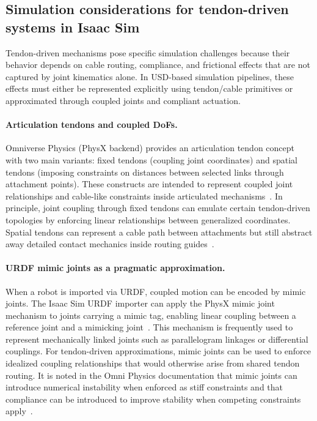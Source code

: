 \subsection{Simulation considerations for tendon-driven systems in Isaac Sim}

Tendon-driven mechanisms pose specific simulation challenges because their behavior depends on cable routing, compliance, and frictional effects that are not captured by joint kinematics alone. In \ac{USD}-based simulation pipelines, these effects must either be represented explicitly using tendon/cable primitives or approximated through coupled joints and compliant actuation.

\paragraph{Articulation tendons and coupled \acp{DoF}.}
Omniverse Physics (PhysX backend) provides an articulation tendon concept with two main variants: fixed tendons (coupling joint coordinates) and spatial tendons (imposing constraints on distances between selected links through attachment points). These constructs are intended to represent coupled joint relationships and cable-like constraints inside articulated mechanisms~\cite{omni_physics_articulations_tendons}. In principle, joint coupling through fixed tendons can emulate certain tendon-driven topologies by enforcing linear relationships between generalized coordinates. Spatial tendons can represent a cable path between attachments but still abstract away detailed contact mechanics inside routing guides~\cite{omni_physics_articulations_tendons}.

\paragraph{URDF mimic joints as a pragmatic approximation.}
When a robot is imported via \ac{URDF}, coupled motion can be encoded by mimic joints. The Isaac Sim \ac{URDF} importer can apply the PhysX mimic joint mechanism to joints carrying a mimic tag, enabling linear coupling between a reference joint and a mimicking joint~\cite{isaacsim_urdf_importer}. This mechanism is frequently used to represent mechanically linked joints such as parallelogram linkages or differential couplings. For tendon-driven approximations, mimic joints can be used to enforce idealized coupling relationships that would otherwise arise from shared tendon routing. It is noted in the Omni Physics documentation that mimic joints can introduce numerical instability when enforced as stiff constraints and that compliance can be introduced to improve stability when competing constraints apply~\cite{omni_physics_articulations_tendons}.

